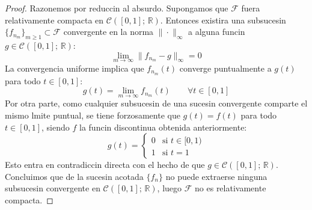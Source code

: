 \begin{proof}
    Razonemos por reduccin al absurdo. Supongamos que $\mathcal{F}$ fuera relativamente compacta en $\mathcal{C}([0, 1]; \, \mathbb{R})$. Entonces existira una subsucesin $\{f_{n_m}\}_{m \geq 1} \subset \mathcal{F}$ convergente en la norma $\|\cdot\|_\infty$ a alguna funcin $g \in \mathcal{C}([0, 1]; \, \mathbb{R})$:
    \[
        \lim_{m \to \infty} \|f_{n_m} - g\|_\infty = 0
    \]
    La convergencia uniforme implica que $f_{n_m}(t)$ converge puntualmente a $g(t)$ para todo $t \in [0, 1]$:
    \[
        g(t) = \lim_{m \to \infty} f_{n_m}(t) \qquad \forall t \in [0, 1]
    \]
    Por otra parte, como cualquier subsucesin de una sucesin convergente comparte el mismo lmite puntual, se tiene forzosamente que $g(t) = f(t)$ para todo $t \in [0, 1]$, siendo $f$ la funcin discontinua obtenida anteriormente:
    \[
        g(t) = \begin{cases}
            0 & \text{si } t \in [0, 1) \\
            1 & \text{si } t = 1
        \end{cases}
    \]
    Esto entra en contradiccin directa con el hecho de que $g \in \mathcal{C}([0, 1]; \, \mathbb{R})$. Concluimos que de la sucesin acotada $\{f_n\}$ no puede extraerse ninguna subsucesin convergente en $\mathcal{C}([0, 1]; \, \mathbb{R})$, luego $\mathcal{F}$ no es relativamente compacta.
\end{proof}

